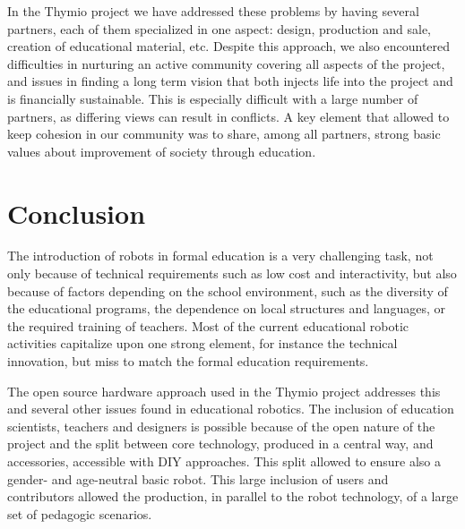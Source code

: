 \documentclass[letterpaper, 10 pt, conference]{ieeeconf}  %
\begin{document}
In the Thymio project we have addressed these problems by having several partners, each of them specialized in one aspect: design, production and sale, creation of educational material, etc.
Despite this approach, we also encountered difficulties in nurturing an active community covering all aspects of the project, and issues in finding a long term vision that both injects life into the project and is financially sustainable.
This is especially difficult with a large number of partners, as differing views can result in conflicts. 
A key element that allowed to keep cohesion in our community was to share, among all partners, strong basic values about improvement of society through education.
\fi


\section{Conclusion}

The introduction of robots in formal education is a very challenging task, not only because of technical requirements such as low cost and interactivity, but also because of factors depending on the school environment, such as the diversity of the educational programs, the dependence on local structures and languages, or the required training of teachers.
Most of the current educational robotic activities capitalize upon one strong element, for instance the technical innovation, but miss to match the formal education requirements.

The open source hardware approach used in the Thymio project addresses this and several other issues found in educational robotics.
The inclusion of education scientists, teachers and designers is possible because of the open nature of the project and the split between core technology, produced in a central way, and accessories, accessible with DIY approaches. This split allowed to ensure also a gender- and age-neutral basic robot.
This large inclusion of users and contributors allowed the production, in parallel to the robot technology, of a large set of pedagogic scenarios.
\end{document}
